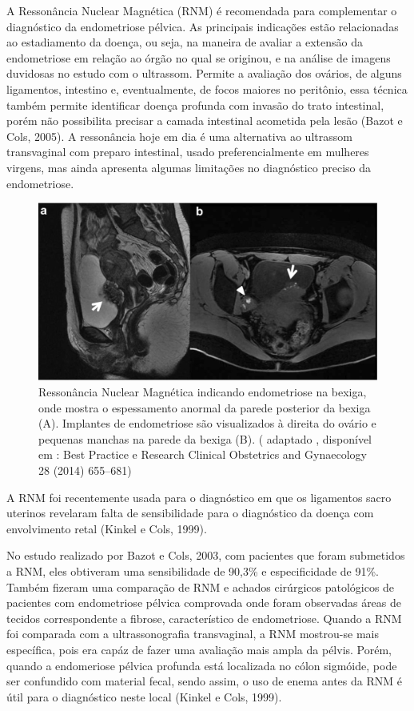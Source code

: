 \documentclass[12pt]{article} %
\begin{document}
A Ressonância Nuclear Magnética (RNM) é recomendada para complementar o diagnóstico da endometriose pélvica. As principais indicações estão relacionadas ao estadiamento da doença, ou seja, na maneira de avaliar a extensão da endometriose em relação ao órgão no qual se originou, e na análise de imagens duvidosas no estudo com o ultrassom. Permite a avaliação dos ovários, de alguns ligamentos, intestino e, eventualmente, de focos maiores no peritônio, essa técnica também permite identificar
doença profunda com invasão do trato intestinal, porém
não possibilita precisar a camada intestinal acometida pela
lesão (Bazot e Cols, 2005). A ressonância hoje em dia é uma alternativa ao ultrassom transvaginal com preparo intestinal, usado preferencialmente em mulheres virgens, mas ainda apresenta algumas limitações no diagnóstico preciso da endometriose.


\begin{figure}[h!]
\centering
\includegraphics[width=14cm]{RNM2.png}
\caption[RNM indicando endometriose na bexiga e no ovário]{Ressonância Nuclear Magnética indicando endometriose na bexiga, onde mostra o espessamento anormal da parede posterior da bexiga (A).  Implantes de endometriose são visualizados à direita do ovário e pequenas manchas na parede da bexiga (B). ( adaptado , disponível em : Best Practice e Research Clinical Obstetrics and Gynaecology 28 (2014) 655–681) }
\end{figure}


A RNM foi recentemente usada para o diagnóstico em que os ligamentos
sacro uterinos revelaram falta de sensibilidade para o diagnóstico da
doença com envolvimento retal (Kinkel e Cols, 1999).

No estudo realizado por Bazot e Cols, 2003, com pacientes que foram
submetidos a RNM, eles obtiveram uma sensibilidade de 90,3\% e
especificidade de 91\%. Também fizeram uma comparação de RNM e
achados cirúrgicos patológicos de pacientes com endometriose pélvica
comprovada onde foram observadas áreas de tecidos correspondente a
fibrose, característico de endometriose. Quando a RNM foi comparada
com a ultrassonografia transvaginal, a RNM mostrou-se mais específica,
pois era capáz de fazer uma avaliação mais ampla da pélvis. Porém,
quando a endomeriose pélvica profunda está localizada no cólon
sigmóide, pode ser confundido com material fecal, sendo assim, o uso
de enema antes da RNM é útil para o diagnóstico neste local (Kinkel e
Cols, 1999).
\end{document}
